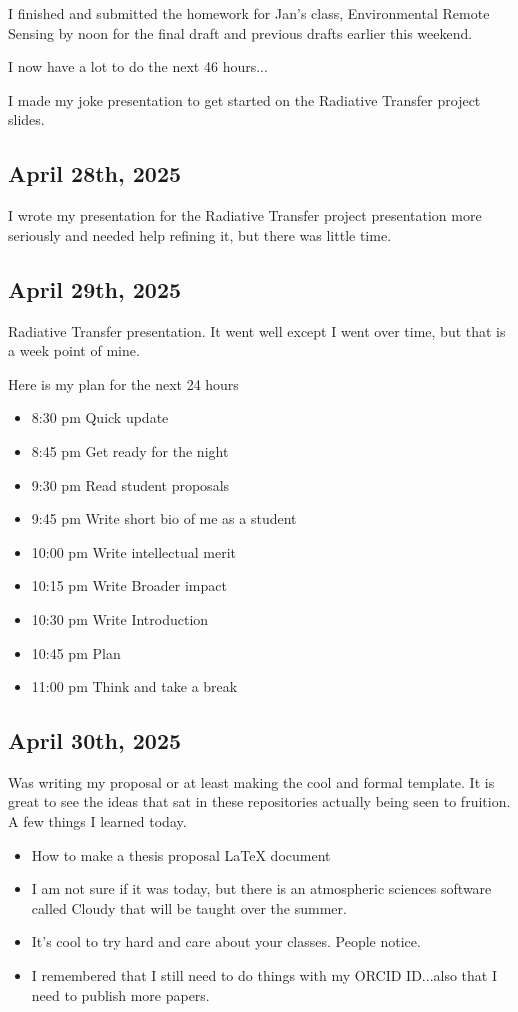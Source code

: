 \documentclass{article}
\begin{document}
I finished and submitted the homework for Jan's class, Environmental Remote Sensing by noon for the final draft and previous drafts earlier this weekend. 

I now have a lot to do the next 46 hours...

I made my joke presentation to get started on the Radiative Transfer project slides.



\subsection{April 28th, 2025}

I wrote my presentation for the Radiative Transfer project presentation more seriously and needed help refining it, but there was little time. 




\subsection{April 29th, 2025}
Radiative Transfer presentation. 
It went well except I went over time, but that is a week point of mine.

Here is my plan for the next 24 hours
\begin{itemize}
    \item 8:30 pm Quick update 
    \item 8:45 pm Get ready for the night
    \item 9:30 pm Read student proposals
    \item 9:45 pm Write short bio of me as a student
    \item 10:00 pm Write intellectual merit 
    \item 10:15 pm Write Broader impact
    \item 10:30 pm Write Introduction
    \item 10:45 pm Plan 
    \item 11:00 pm Think and take a break
\end{itemize}


\subsection{April 30th, 2025}
Was writing my proposal or at least making the cool and formal template. It is great to see the ideas that sat in these repositories actually being seen to fruition. 
A few things I learned today.
\begin{itemize}
    \item How to make a thesis proposal LaTeX document
    \item I am not sure if it was today, but there is an atmospheric sciences software called Cloudy that will be taught over the summer. 
    \item It's cool to try hard and care about your classes. People notice.
    \item I remembered that I still need to do things with my ORCID ID...also that I need to publish more papers. 
\end{itemize}
\end{document}
